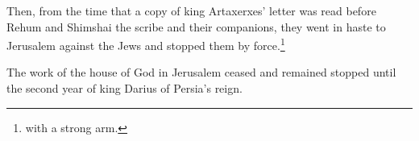 \begin{inparaenum}
     Then, from the time that a copy of king Artaxerxes' letter was read before Rehum and Shimshai the scribe and their companions, they went in haste to Jerusalem against the Jews and stopped them by force.\footnote{with a strong arm.}%
    
     The work of the house of God in Jerusalem ceased and remained stopped until the second year of king Darius of Persia's reign.%
\end{inparaenum}
